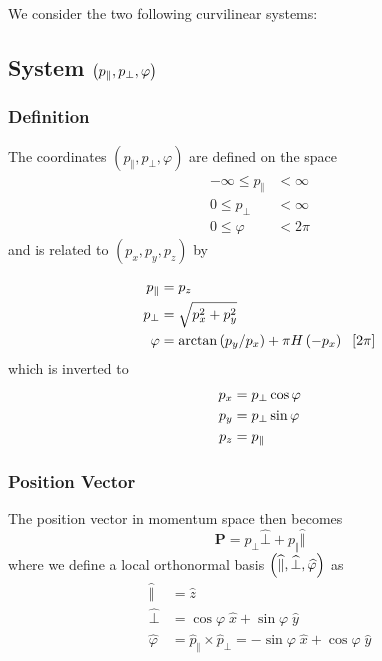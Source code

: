 We consider the two following curvilinear systems:

\subsection{System $\left( p_{\Vert},p_{\bot},\protect\varphi\right) $}

\subsubsection{Definition}

The coordinates $\left( p_{\Vert},p_{\bot},\varphi\right) $ are defined on
the space 
\begin{align}
-\infty\leq p_{\Vert} & <\infty \\
0\leq p_{\bot} & <\infty \\
0\leq\varphi & <2\pi
\end{align}
and is related to $\left( p_{x},p_{y},p_{z}\right) $ by

\begin{align}
p_{\Vert} & =p_{z}  \label{pparpperpdef} \\
p_{\bot} & =\sqrt{p_{x}^{2}+p_{y}^{2}}  \notag \\
\varphi & =\arctan\left( p_{y}/p_{x}\right) +\pi H\left( -p_{x}\right) \;\ 
\left[ 2\pi\right]  \notag
\end{align}
which is inverted to 
\begin{align}
p_{x} & =p_{\bot}\cos\varphi \\
p_{y} & =p_{\bot}\sin\varphi  \notag \\
p_{z} & =p_{\Vert}  \notag
\end{align}

\subsubsection{Position Vector}

The position vector in momentum space then becomes 
\begin{equation}
\mathbf{P}=p_{\bot}\widehat{\bot}+p_{\Vert}\widehat{\Vert}  \label{pparperp}
\end{equation}
where we define a local orthonormal basis $\left( \widehat{\Vert},\widehat{%
\bot},\widehat{\varphi}\right) $ as 
\begin{align}
\widehat{\Vert} & =\widehat{z} \\
\widehat{\bot} & =\cos\varphi\;\widehat{x}+\sin\varphi\;\widehat{y} \\
\widehat{\varphi} & =\widehat{p}_{\Vert}\times\widehat{p}_{\bot}=-\sin%
\varphi\;\widehat{x}+\cos\varphi\;\widehat{y}
\end{align}

